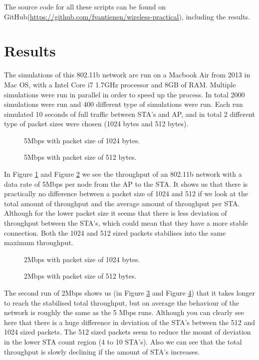 \documentclass[]{article}
\begin{document}
The source code for all these scripts can be found on GitHub(\url{https://github.com/fvantienen/wireless-practical}), including the results.

\newpage
\section{Results}
The simulations of this 802.11b network are run on a Macbook Air from 2013 in Mac OS, with a Intel Core i7 1.7GHz processor and 8GB of RAM.
Multiple simulations were run in parallel in order to speed up the process.
In total 2000 simulations were run and 400 different type of simulations were run.
Each run simulated 10 seconds of full traffic between STA's and AP, and in total 2 different type of packet sizes were chosen (1024 bytes and 512 bytes).

\begin{figure}[H]
   
   \caption{5Mbps with packet size of 1024 bytes.\label{fig:tp_5}}
\end{figure}
\begin{figure}[H]
    
   \caption{5Mbps with packet size of 512 bytes.\label{fig:tp5_5}}
\end{figure}

In Figure \ref{fig:tp_5} and Figure \ref{fig:tp5_5} we see the throughput of an 802.11b network with a data rate of 5Mbps per node from the AP to the STA.
It shows us that there is practically no difference between a packet size of 1024 and 512 if we look at the total amount of throughput and the average amount of throughput per STA.
Although for the lower packet size it seems that there is less deviation of throughput between the STA's, which could mean that they have a more stable connection.
Both the 1024 and 512 sized packets stabilises into the same maximum throughput.

\begin{figure}[H]
    
   \caption{2Mbps with packet size of 1024 bytes.\label{fig:tp_2}}
\end{figure}
\begin{figure}[H]
    
   \caption{2Mbps with packet size of 512 bytes.\label{fig:tp5_2}}
\end{figure}

The second run of 2Mbps shows us (in Figure \ref{fig:tp_2} and Figure \ref{fig:tp5_2}) that it takes longer to reach the stabilised total throughput, but on average the behaviour of the network is roughly the same as the 5 Mbps runs.
Although you can clearly see here that there is a huge difference in deviation of the STA's between the 512 and 1024 sized packets.
The 512 sized packets seem to reduce the mount of deviation in the lower STA count region (4 to 10 STA's).
Also we can see that the total throughput is slowly declining if the amount of STA's increases.
\end{document}
